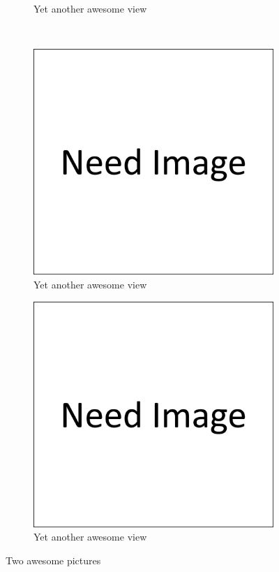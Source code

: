 \begin{figure}
\begin{subfigure}[b]{0.45\textwidth}
        \caption{Yet another awesome view}
        \label{fig:another_awesome_view_b}
    \end{subfigure}
    \\
    \begin{subfigure}[b]{0.45\textwidth}
        \centering
        \includegraphics[width=\textwidth]{images/need image.png}
        \caption{Yet another awesome view}
        \label{fig:another_awesome_view_b}
    \end{subfigure}
    \hfill
    \begin{subfigure}[b]{0.45\textwidth}
        \centering
        \includegraphics[width=\textwidth]{images/need image.png}
        \caption{Yet another awesome view}
        \label{fig:another_awesome_view_b}
    \end{subfigure}
    \caption{Two awesome pictures}
    \label{fig:two_awesome_pictures}
\end{figure}


